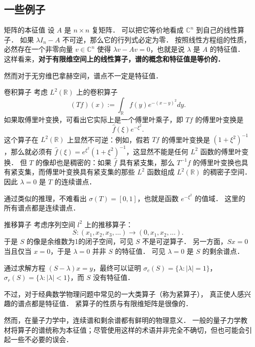 \subsection{一些例子}
\begin{example}{矩阵的本征值}
设 $A$ 是 $n\times n$ 复矩阵． 可以把它等价地看成 $\mathbb{C}^n$ 到自己的线性算子． 如果 $\lambda I_n-A$ 不可逆，那么它的行列式必定为零． 按照线性方程组的性质，必然存在一个非零向量 $v\in \mathbb{C}^n$ 使得 $\lambda v-Av=0$，也就是说 $\lambda$ 是 $A$ 的特征值． 这样看来，\textbf{对于有限维空间上的线性算子，谱的概念和特征值是等价的．}
\end{example}

然而对于无穷维巴拿赫空间，谱点不一定是特征值．

\begin{example}{卷积算子}
考虑 $L^2(\mathbb{R})$ 上的卷积算子
$$
(Tf)(x):=\int_{\mathbb{R}}f(y)e^{-(x-y)^2}dy.
$$
如果取傅里叶变换，可看出它实际上是一个傅里叶乘子，即 $Tf$ 的傅里叶变换是
$$
\hat f(\xi)e^{-\xi^2}.
$$
这个算子在 $L^2(\mathbb{R})$ 上显然不可逆：例如，假若 $Tf$ 的傅里叶变换是 $(1+\xi^2)^{-1}$，那么就必须有 $\hat f(\xi)=e^{\xi^2}(1+\xi^2)^{-1}$，这显然不能是任何 $L^2$ 函数的傅里叶变换． 但 $T$ 的像却也是稠密的：如果 $\hat f$ 具有紧支集，那么 $T^{-1}f$ 的傅里叶变换也具有紧支集，而傅里叶变换具有紧支集的那些 $L^2$ 函数组成 $L^2(\mathbb{R})$ 的稠密子空间． 因此 $\lambda=0$ 是 $T$ 的连续谱点．

通过类似的推理，不难看出 $\sigma(T)=[0,1]$，也就是函数 $e^{-\xi^2}$ 的值域． 这里的所有谱点都是连续谱点．
\end{example}

\begin{example}{推移算子}
考虑序列空间 $l^2$ 上的推移算子：
$$
S:(x_1,x_2,x_3,\dots)\to(0,x_1,x_2,\dots).
$$
于是 $S$ 的像是余维数为1的闭子空间，可见 $S$ 不是可逆算子． 另一方面，$Sx=0$ 当且仅当 $x=0$，于是 $\lambda=0$ 并非 $S$ 的特征值． 可见 $\lambda=0$ 是 $S$ 的剩余谱点．

通过求解方程 $(S-\lambda)x=y$，最终可以证明 $\sigma_c(S)=\{\lambda:|\lambda|=1\}$，$\sigma_r(S)=\{\lambda:|\lambda|<1\}$，而 $S$ 没有特征值．
\end{example}

不过，对于经典数学物理问题中常见的一大类算子（称为紧算子）， 真正使人感兴趣的谱点都是特征值． 紧算子的性质与有限维矩阵是很像的．

然而，在量子力学中，连续谱和剩余谱都有鲜明的物理意义． 一般的量子力学教材将算子的谱统称为本征值；尽管使用这样的术语并非完全不确切，但也可能会引起一些不必要的误会．
